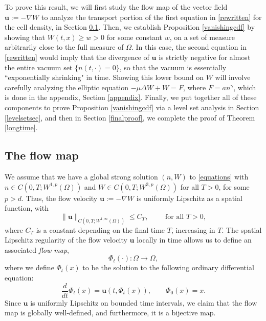 \documentclass[12pt]{article}
\newcommand{\bd}{\boldsymbol}
\theoremstyle{plain}
\begin{document}
\medskip

To prove this result, we will first study the flow map of the vector field $\bd{u} := -\nabla W$ to analyze the transport portion of the first equation in \eqref{rewritten} for the cell density, in Section \ref{transport}. Then, we establish Proposition \ref{vanishingcdf} by showing that $W(t, x) \ge w > 0$ for some constant $w$, on a set of measure arbitrarily close to the full measure of $\Omega$. In this case, the second equation in \eqref{rewritten} would imply that the divergence of $\bd{u}$ is strictly negative for almost the entire vacuum set $\{n(t, \cdot) = 0\}$, so that the vacuum is essentially ``exponentially shrinking" in time. Showing this lower bound on $W$ will involve carefully analyzing the elliptic equation $-\mu \Delta W + W = F$, where $F = an^{\gamma}$, which is done in the appendix, Section \ref{appendix}. Finally, we put together all of these components to prove Proposition \ref{vanishingcdf} via a level set analysis in Section \ref{levelsetsec}, and then in Section \ref{finalproof}, we complete the proof of Theorem \ref{longtime}.

\subsection{The flow map}\label{transport}

We assume that we have a global strong solution $(n, W)$ to \eqref{equations} with $n \in C(0, T; W^{1, p}(\Omega))$ and $W \in C(0, T; W^{3, p}(\Omega))$ for all $T > 0$, for some $p > d$. Thus, the flow velocity $\bd{u} := -\nabla W$ is uniformly Lipschitz as a spatial function, with 
\begin{equation*}
\|\bd{u}\|_{C(0, T; W^{1, \infty}(\Omega))} \le C_{T}, \qquad \text{ for all } T > 0,
\end{equation*}
where $C_{T}$ is a constant depending on the final time $T$, increasing in $T$. The spatial Lipschitz regularity of the flow velocity $\bd{u}$ locally in time allows us to define an associated \textit{flow map},
\begin{equation*}
\Phi_{t}(\cdot): \Omega \to \Omega,
\end{equation*}
where we define $\Phi_{t}(x)$ to be the solution to the following ordinary differential equation:
\begin{equation}\label{flow}
\frac{d}{dt}\Phi_{t}(x) = \bd{u}(t, \Phi_{t}(x)), \qquad \Phi_{0}(x) = x.
\end{equation}
Since $\bd{u}$ is uniformly Lipschitz on bounded time intervals, we claim that the flow map is globally well-defined, and furthermore, it is a bijective map.
\end{document}
